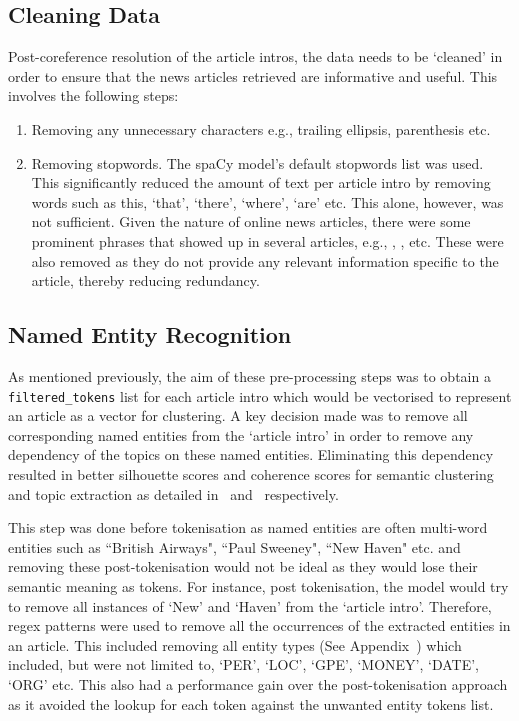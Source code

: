 \subsection{Cleaning Data} \label{data_cleaning}
Post-coreference resolution of the article intros, the data needs to be `cleaned' in order to ensure that the news articles retrieved are informative and useful. This involves the following steps: 
\begin{enumerate}
    \item Removing any unnecessary characters e.g., trailing ellipsis, parenthesis etc.
    \item Removing stopwords. The spaCy model's default stopwords list was used. This significantly reduced the amount of text per article intro by removing words such as this, `that', `there', `where', `are' etc. This alone, however, was not sufficient. Given the nature of online news articles, there were some prominent phrases that showed up in several articles, e.g., , ,  etc. These were also removed as they do not provide any relevant information specific to the article, thereby reducing redundancy.

\end{enumerate}

\subsection{Named Entity Recognition}
As mentioned previously, the aim of these pre-processing steps was to obtain a \texttt{filtered\_tokens} list for each article intro which would be vectorised to represent an article as a vector for clustering. A key decision made was to remove all corresponding named entities from the `article intro' in order to remove any dependency of the topics on these named entities. Eliminating this dependency resulted in better silhouette scores and coherence scores for semantic clustering and topic extraction as detailed in~ and~ respectively. 

This step was done before tokenisation as named entities are often multi-word entities such as ``British Airways", ``Paul Sweeney", ``New Haven" etc. and removing these post-tokenisation would not be ideal as they would lose their semantic meaning as tokens. For instance, post tokenisation, the model would try to remove all instances of `New' and `Haven' from the `article intro'. Therefore, regex patterns were used to remove all the occurrences of the extracted entities in an article. This included removing all entity types (See Appendix~) which included, but were not limited to, `PER', `LOC', `GPE', `MONEY', `DATE', `ORG' etc. This also had a performance gain over the post-tokenisation approach as it avoided the lookup for each token against the unwanted entity tokens list.

